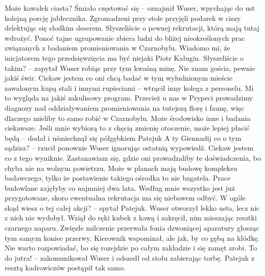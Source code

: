\documentclass[../MAIN.tex]{subfiles}
\begin{document}
\sx
Może kawałek ciasta? Śmiało częstować się -- oznajmił Wuser, wpychając do ust kolejną porcję jabłecznika. 
Zgromadzeni przy stole przyjęli podarek w ciszy delektując się słodkim deserem. 
\xx Słyszeliście o pewnej rekrutacji, którą mają tutaj wdrożyć. Ponoć tajne ugrupowanie zbiera ludzi do bliżej nieokreślonych prac związanych z badaniem promieniowania w Czarnobylu. Wiadomo mi, że inicjatorem tego przedsięwzięcia ma być niejaki Piotr Kaługin. Słyszeliście o takim? -- zapytał Wuser robiąc przy tym kwaśną minę. 
\xx Nie znam gościa, pewnie jakiś świr. Ciekaw jestem co oni chcą badać w tym wyludnionym mieście zawalonym kupą stali i innymi rupieciami -- wtrącił inny kolega z personelu. 
\xx Mi to wygląda na jakiś zakulisowy program. Przecież u nas w Prypeci prowadzimy diagnozy nad oddziaływaniem promieniowania na tutejszą florę i faunę, więc dlaczego mieliby to samo robić w Czarnobylu. Może środowisko inne i badania ciekawsze. Jeśli mnie wybiorą to z chęcią zmienię otoczenie, może lepiej płacić będą -- dodał i uśmiechnął się półgębkiem Patejuk 
\xx A ty Giennadij co o tym sądzisz? -- rzucił ponownie Wuser ignorując ostatnią wypowiedź. 
\xx Ciekaw jestem co z tego wyniknie. Zastanawiam się, gdzie oni prowadzaliby te doświadczenia, bo chyba nie na wolnym powietrzu. Może w planach mają budowę kompleksu badawczego, tylko że postawienie takiego ośrodka to nie bagatela. Prace budowlane zajęłyby co najmniej dwa lata. 
\xx Według mnie wszystko jest już przygotowane, skoro ewentualna rekrutacja ma się niebawem odbyć. W ogóle skąd wiesz o tej całej akcji? -- spytał Patejuk.
\qd
Wuser otworzył lekko usta, lecz nic z nich nie wydobył. Wziął do ręki kubek z kawą i zakręcił, nim mieszając resztki czarnego naparu. Zwięzłe milczenie przerwała fonia dzwoniącej aparatury głosząc tym samym koniec przerwy. 
% 
\sx Kierownik wspominał, ale jak, by co gębą na kłódkę. Nie warto rozpowiadać, bo się rozejdzie po całym zakładzie i się zamęt zrobi. To do jutra! -- zakomunikował Wuser i odszedł od stołu zabierając torbę. 
\qd
Patejuk z resztą kadrowiczów postąpił tak samo.
\end{document}

